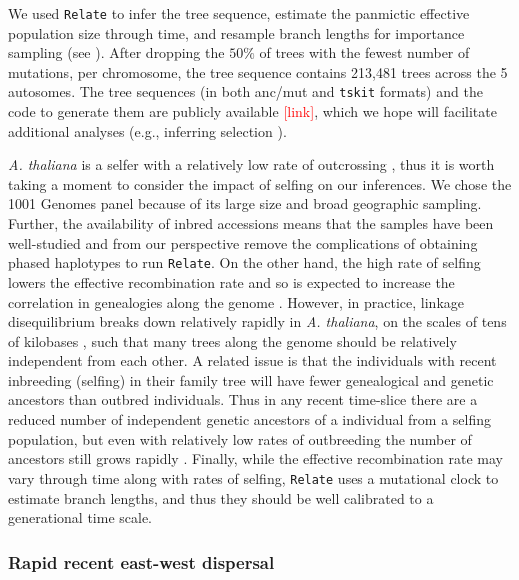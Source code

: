 \documentclass[12pt]{article}
\newcommand{\mo}[1]{\textcolor{red}{[#1]}} %
\begin{document}
We used \texttt{Relate} \citep{speidel2019method} to infer the tree sequence, estimate the panmictic effective population size through time, and resample branch lengths for importance sampling (see ).
After dropping the $50\%$ of trees with the fewest number of mutations, per chromosome, the tree sequence contains 213,481 trees across the 5 autosomes.
The tree sequences (in both anc/mut and \texttt{tskit} formats) and the code to generate them are publicly available \mo{link}, which we hope will facilitate additional analyses (e.g., inferring selection \citep{stern2019approximate,stern2020disentangling}).

\textit{A. thaliana} is a selfer with a relatively low rate of outcrossing \citep{bomblies2010local,platt2010scale}, thus it is worth taking a moment to consider the impact of selfing on our inferences. 
We chose the 1001 Genomes panel because of its large size and broad geographic sampling.
Further, the availability of inbred accessions means that the samples have been well-studied and from our perspective remove the complications of obtaining phased haplotypes to run \texttt{Relate}. 
On the other hand, the high rate of selfing lowers the effective recombination rate and so is expected to increase the correlation in genealogies along the genome \citep{nordborg2000linkage}. 
However, in practice, linkage disequilibrium breaks down relatively rapidly in \textit{A. thaliana}, on the scales of tens of kilobases \citep{kim2007recombination}, such that many trees along the genome should be relatively independent from each other. 
A related issue is that the individuals with recent inbreeding (selfing) in their family tree will have fewer genealogical and genetic ancestors than outbred individuals. 
Thus in any recent time-slice there are a reduced number of independent genetic ancestors of a individual from a selfing population, but even with relatively low rates of outbreeding the number of ancestors still grows rapidly \citep{lachance2009inbreeding}. 
Finally, while the effective recombination rate may vary through time along with rates of selfing, \texttt{Relate} uses a mutational clock to estimate branch lengths, and thus they should be well calibrated to a generational time scale.

\subsubsection*{Rapid recent east-west dispersal}
\end{document}
